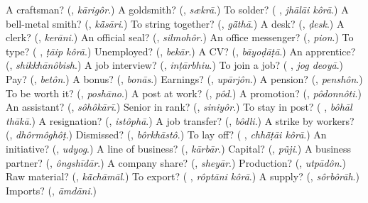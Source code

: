 \begin{tcolorbox}[breakable,colback=teal!4,colframe=teal!35!black,title={Before you move on}]
A craftsman? (\textbf{}, \emph{kārigôr}.) A goldsmith? (\textbf{}, \emph{sækrā}.) To solder? (\textbf{ }, \emph{jhālāi kôrā}.) A bell-metal smith? (\textbf{}, \emph{kā̃sāri}.) To string together? (\textbf{}, \emph{gā̃thā}.) A desk? (\textbf{}, \emph{ḍesk}.) A clerk? (\textbf{}, \emph{kerāni}.) An official seal? (\textbf{}, \emph{silmohôr}.) An office messenger? (\textbf{}, \emph{pion}.) To type? (\textbf{ }, \emph{ṭāip kôrā}.) Unemployed? (\textbf{}, \emph{bekār}.) A CV? (\textbf{}, \emph{bāyoḍāṭā}.) An apprentice? (\textbf{}, \emph{shikkhānôbish}.) A job interview? (\textbf{}, \emph{inṭārbhiu}.) To join a job? (\textbf{ }, \emph{jog deoyā}.) Pay? (\textbf{}, \emph{betôn}.) A bonus? (\textbf{}, \emph{bonās}.) Earnings? (\textbf{}, \emph{upārjôn}.) A pension? (\textbf{}, \emph{penshôn}.) To be worth it? (\textbf{}, \emph{poshāno}.) A post at work? (\textbf{}, \emph{pôd}.) A promotion? (\textbf{}, \emph{pôdonnôti}.) An assistant? (\textbf{}, \emph{sôhôkārī}.) Senior in rank? (\textbf{}, \emph{siniyôr}.) To stay in post? (\textbf{ }, \emph{bôhāl thākā}.) A resignation? (\textbf{}, \emph{istôphā}.) A job transfer? (\textbf{}, \emph{bôdli}.) A strike by workers? (\textbf{}, \emph{dhôrmôghôṭ}.) Dismissed? (\textbf{}, \emph{bôrkhāstô}.) To lay off? (\textbf{ }, \emph{chhā̃ṭāi kôrā}.) An initiative? (\textbf{}, \emph{udyog}.) A line of business? (\textbf{}, \emph{kārbār}.) Capital? (\textbf{}, \emph{pũji}.) A business partner? (\textbf{}, \emph{ôngshīdār}.) A company share? (\textbf{}, \emph{sheyār}.) Production? (\textbf{}, \emph{utpādôn}.) Raw material? (\textbf{}, \emph{kā̃chāmāl}.) To export? (\textbf{ }, \emph{rôptāni kôrā}.) A supply? (\textbf{}, \emph{sôrbôrāh}.) Imports? (\textbf{}, \emph{āmdāni}.)
\end{tcolorbox}
